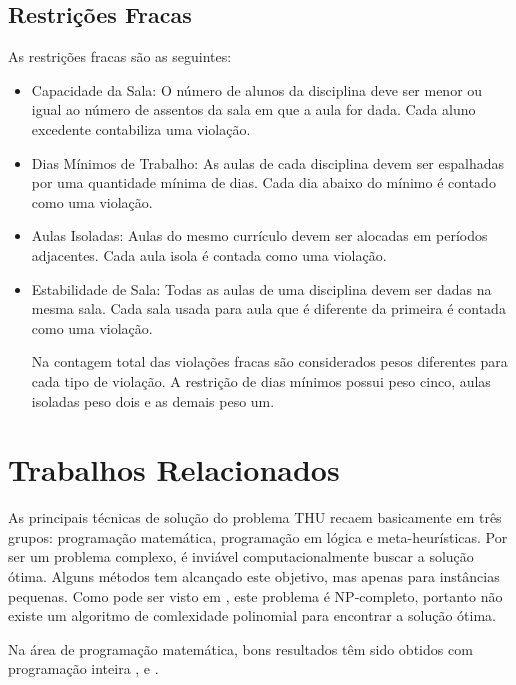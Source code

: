 \documentclass[11pt]{article}
\begin{document}
\subsection{Restrições Fracas}

As restrições fracas são as seguintes:

\begin{itemize}

\item Capacidade da Sala: O número de alunos da disciplina deve ser menor ou igual ao número de assentos da sala em que a aula for dada. Cada aluno excedente contabiliza uma violação.

\item Dias Mínimos de Trabalho: As aulas de cada disciplina devem ser espalhadas por uma quantidade mínima de dias. Cada dia abaixo do mínimo é contado como uma violação.

\item Aulas Isoladas: Aulas do mesmo currículo devem ser alocadas em períodos adjacentes. Cada aula isola é contada como uma violação.

\item Estabilidade de Sala: Todas as aulas de uma disciplina devem ser dadas na mesma sala. Cada sala usada para aula que é diferente da primeira é contada como uma violação.

Na contagem total das violações fracas são considerados pesos diferentes para cada tipo de violação. A restrição de dias mínimos possui peso cinco, aulas isoladas peso dois e as demais peso um.

\end{itemize}


\section{Trabalhos Relacionados}
\label{sec:trabalhos_relacionados}

As principais técnicas de solução do problema THU recaem basicamente em três grupos: programação matemática, programação em lógica e meta-heurísticas. Por ser um problema complexo, é inviável computacionalmente buscar a solução ótima. Alguns métodos tem alcançado este objetivo, mas apenas para instâncias pequenas. Como pode ser visto em \cite{Schaerf95asurvey}, este problema é NP-completo, portanto não existe um algoritmo de comlexidade polinomial para encontrar a solução ótima.

Na área de programação matemática, bons resultados têm sido obtidos com programação inteira \cite{lach_lubbecke}, \cite{broek_hurkens} e \cite{Burke_abranch-andcut}.
\end{document}
